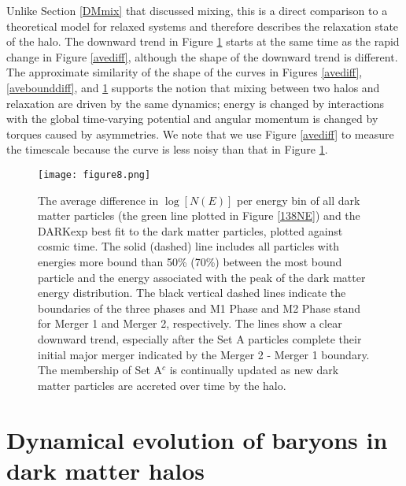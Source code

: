 \documentclass[a4paper,11pt]{article}
\begin{document}
Unlike Section \ref{DMmix} that discussed mixing, this is a direct comparison to a theoretical model for relaxed systems and 
therefore describes the relaxation state of the halo.  The downward trend in Figure \ref{dmave_diff} starts at the same time as the rapid change in 
Figure \ref{avediff}, although the shape of the downward trend is different.  The approximate similarity of the shape of the curves in Figures \ref{avediff}, 
\ref{avebounddiff}, and \ref{dmave_diff} supports the notion that mixing between two halos and relaxation are driven by the same dynamics; energy is changed 
by interactions with the global time-varying potential and angular momentum is changed by torques caused by asymmetries.  We note that we use Figure 
\ref{avediff} to measure the timescale because the curve is less noisy than that in Figure \ref{dmave_diff}.

\begin{figure}
\centering
\texttt{[image: figure8.png]}
\caption{The average difference in $\log[N(E)]$ per energy bin of all dark matter particles (the green line plotted in Figure \ref{138NE}) and the DARKexp best 
fit to the dark matter particles, plotted against cosmic time.  The solid (dashed) line includes all particles with energies more bound than 50\% (70\%) 
between the most bound particle and the energy associated with the 
peak of the dark matter energy distribution.  The black vertical dashed lines indicate the boundaries of the three phases and M1 Phase and M2 Phase stand for Merger 1 and Merger 2, 
respectively.  The 
lines show a clear downward trend, especially after the Set A particles complete their 
initial major merger indicated by the Merger 2 - Merger 1 boundary.  The membership of Set A$^c$ is continually updated as new dark matter 
particles are accreted over time by the halo.}
\label{dmave_diff}
\end{figure}


\section{Dynamical evolution of baryons in dark matter halos}\label{DEB}
\end{document}
